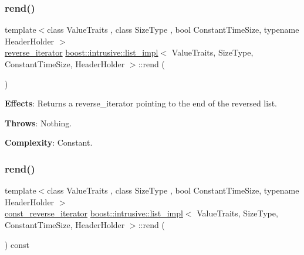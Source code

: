\subsubsection{\texorpdfstring{rend()}{rend()}\hspace{0.1cm}{\footnotesize\ttfamily [1/2]}}
{\footnotesize\ttfamily template$<$class Value\+Traits , class Size\+Type , bool Constant\+Time\+Size, typename Header\+Holder $>$ \\
\hyperlink{classboost_1_1intrusive_1_1list__impl_aed95b235a2056faa7d2f8cbd58dcfeb7}{reverse\+\_\+iterator} \hyperlink{classboost_1_1intrusive_1_1list__impl}{boost\+::intrusive\+::list\+\_\+impl}$<$ Value\+Traits, Size\+Type, Constant\+Time\+Size, Header\+Holder $>$\+::rend (\begin{DoxyParamCaption}{ }\end{DoxyParamCaption})\hspace{0.3cm}{\ttfamily [inline]}}

{\bfseries Effects}\+: Returns a reverse\+\_\+iterator pointing to the end of the reversed list.

{\bfseries Throws}\+: Nothing.

{\bfseries Complexity}\+: Constant. \mbox{\label{classboost_1_1intrusive_1_1list__impl_a0be73e24a3891a9ca9391c9762e5cc72}} 
\subsubsection{\texorpdfstring{rend()}{rend()}\hspace{0.1cm}{\footnotesize\ttfamily [2/2]}}
{\footnotesize\ttfamily template$<$class Value\+Traits , class Size\+Type , bool Constant\+Time\+Size, typename Header\+Holder $>$ \\
\hyperlink{classboost_1_1intrusive_1_1list__impl_a00a0933ca1d92836a220a604e521d9c4}{const\+\_\+reverse\+\_\+iterator} \hyperlink{classboost_1_1intrusive_1_1list__impl}{boost\+::intrusive\+::list\+\_\+impl}$<$ Value\+Traits, Size\+Type, Constant\+Time\+Size, Header\+Holder $>$\+::rend (\begin{DoxyParamCaption}{ }\end{DoxyParamCaption}) const\hspace{0.3cm}{\ttfamily [inline]}}

